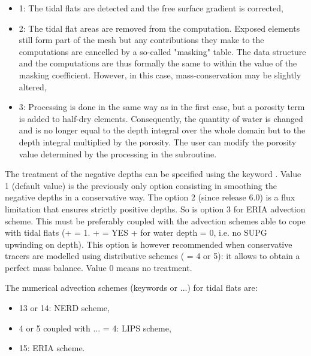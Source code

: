 \begin{itemize}
\item 1: The tidal flats are detected and the free surface gradient
is corrected,

\item 2: The tidal flat areas are removed from the computation.
Exposed elements still form part of the mesh but any contributions they make
to the computations are cancelled by a so-called "masking" table.
The data structure and the computations are thus formally the same to
within the value of the masking coefficient.
However, in this case, mass-conservation may be slightly altered,

\item 3: Processing is done in the same way as in the first case,
but a porosity term is added to half-dry elements.
Consequently, the quantity of water is changed and is no longer equal
to the depth integral over the whole domain but to the depth integral
multiplied by the porosity.
The user can modify the porosity value determined by the processing in the
 subroutine.
\end{itemize}


The treatment of the negative depths can be specified using the keyword
.
Value 1 (default value) is the previously only option consisting in smoothing
the negative depths in a conservative way.
The option 2 (since release 6.0) is a flux limitation
that ensures strictly positive depths.
So is option 3 for ERIA advection scheme.
This must be preferably coupled with the advection schemes able to cope
with tidal flats (+  = 1.
+  = YES
+  for water depth = 0, i.e. no SUPG upwinding on depth).
This option is however recommended when conservative tracers are modelled
using distributive schemes ( = 4 or 5):
it allows to obtain a perfect mass balance. Value 0 means no treatment.

The numerical advection schemes (keywords 
or ...) for tidal flats are:
\begin{itemize}
\item 13 or 14: NERD scheme,
\item 4 or 5 coupled with ... = 4:
LIPS scheme,
\item 15: ERIA scheme.
\end{itemize}

